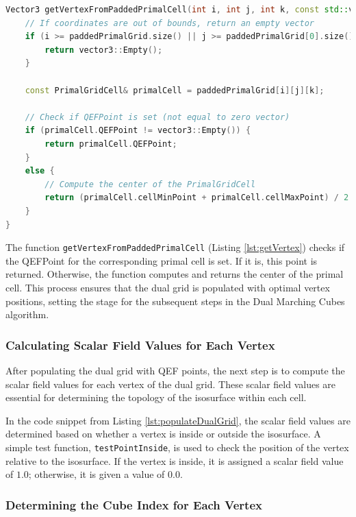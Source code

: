\vspace{2mm}
\begin{lstlisting}[language=C++, caption=Fetching Vertex from Padded Primal Cell, label=lst:getVertex]
Vector3 getVertexFromPaddedPrimalCell(int i, int j, int k, const std::vector<std::vector<std::vector<PrimalGridCell>>>& paddedPrimalGrid) {
	// If coordinates are out of bounds, return an empty vector
	if (i >= paddedPrimalGrid.size() || j >= paddedPrimalGrid[0].size() || k >= paddedPrimalGrid[0][0].size()) {
		return vector3::Empty();
	}

	const PrimalGridCell& primalCell = paddedPrimalGrid[i][j][k];

	// Check if QEFPoint is set (not equal to zero vector)
	if (primalCell.QEFPoint != vector3::Empty()) {
		return primalCell.QEFPoint;
	}
	else {
		// Compute the center of the PrimalGridCell
		return (primalCell.cellMinPoint + primalCell.cellMaxPoint) / 2.0;
	}
}
\end{lstlisting}
\vspace{2mm}

The function \texttt{getVertexFromPaddedPrimalCell} (Listing \ref{lst:getVertex}) checks if the QEFPoint for the corresponding primal cell is set. If it is, this point is returned. Otherwise, the function computes and returns the center of the primal cell. This process ensures that the dual grid is populated with optimal vertex positions, setting the stage for the subsequent steps in the Dual Marching Cubes algorithm.

\subsubsection{Calculating Scalar Field Values for Each Vertex}

After populating the dual grid with QEF points, the next step is to compute the scalar field values for each vertex of the dual grid. These scalar field values are essential for determining the topology of the isosurface within each cell.

In the code snippet from Listing \ref{lst:populateDualGrid}, the scalar field values are determined based on whether a vertex is inside or outside the isosurface. A simple test function, \texttt{testPointInside}, is used to check the position of the vertex relative to the isosurface. If the vertex is inside, it is assigned a scalar field value of \(1.0\); otherwise, it is given a value of \(0.0\).

\subsubsection{Determining the Cube Index for Each Vertex}

